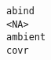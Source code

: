 \documentclass[
  letterpaper,
  DIV=11,
  numbers=noendperiod]{scrreprt}
\begin{document}
\begin{verbatim}
abind                                                                                                                                                                                                                                                                                                                                                                                                                                                                                                                                                                                                                                                                                                                                                                                                                                                                                                                                                                                                                                                                                                                                                                                                                                                                                                    <NA>
ambient                                                                                                                                                                                                                                                                                                                                                                                                                                                                                                                                                                                                                                                                                                                                                                                                                                                                                                                                                                                                                                                                                                                                                                                                                                                                                                  covr

\end{verbatim}
\end{document}
